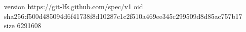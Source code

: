version https://git-lfs.github.com/spec/v1
oid sha256:f500d485094d6f41738f8d10287c1c2f510a469ee345c299509d8d85ac757b17
size 6291608
